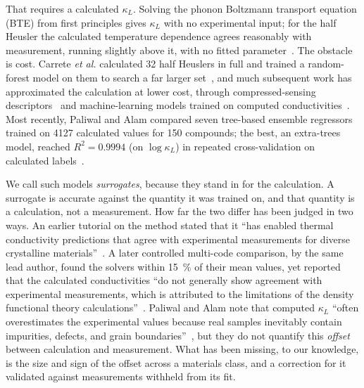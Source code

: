 That requires a calculated $\kappa_L$. Solving the phonon Boltzmann
transport equation (BTE) from first principles gives $\kappa_L$ with no experimental input; for
the half Heusler  the calculated temperature dependence agrees reasonably with
measurement, running slightly above it, with no fitted parameter~\cite{shiomi2011thermal}. The
obstacle is cost. Carrete \emph{et al.} calculated \num{32} half Heuslers in full and trained a
random-forest model on them to search a far larger set~\cite{carrete2014finding}, and much
subsequent work has approximated the calculation at lower cost, through compressed-sensing
descriptors~\cite{liu2020a} and machine-learning models trained on computed
conductivities~\cite{luo2023predicting,trans2022lattice,miyazaki2021machine,jaafreh2021lattice,bhattacharjee2022thorough}.
Most recently, Paliwal and Alam compared seven tree-based ensemble regressors trained on \num{4127}
calculated values for \num{150} compounds; the best, an extra-trees model, reached
$R^2 = \num{0.9994}$ (on $\log\kappa_L$) in repeated cross-validation on calculated
labels~\cite{paliwal2025accelerate}.

We call such models \emph{surrogates}, because they stand in for the calculation. A surrogate is
accurate against the quantity it was trained on, and that quantity is a calculation, not a
measurement. How far the two differ has been judged in two ways. An earlier tutorial on the method
stated that it ``has enabled thermal conductivity predictions that agree with experimental
measurements for diverse crystalline materials''~\cite{mcgaughey2019phonon}. A later controlled
multi-code comparison, by the same lead author, found the solvers within \SI{15}{\percent} of
their mean values, yet reported that the calculated conductivities ``do not generally show
agreement with experimental measurements, which is attributed to the limitations of the density
functional theory calculations''~\cite{mcgaughey2025phonon}. Paliwal and Alam note that
computed $\kappa_L$ ``often overestimates the experimental values because real samples inevitably
contain impurities, defects, and grain boundaries''~\cite{paliwal2025accelerate}, but they do not
quantify this \emph{offset} between calculation and measurement. What has been missing, to our
knowledge, is the size and sign of the offset across a materials class, and a correction for it
validated against measurements withheld from its fit.

